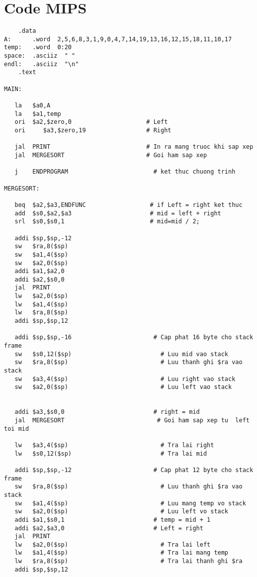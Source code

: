 \documentclass[a4paper]{article}
\begin{document}
\section{Code MIPS}
\begin{verbatim}
    .data 
A:   	.word  2,5,6,8,3,1,9,0,4,7,14,19,13,16,12,15,18,11,10,17
temp: 	.word  0:20
space: 	.asciiz  " "
endl:   .asciiz  "\n"
    .text

MAIN:

   la 	$a0,A
   la 	$a1,temp
   ori 	$a2,$zero,0                     # Left
   ori     $a3,$zero,19                 # Right
	
   jal 	PRINT                           # In ra mang truoc khi sap xep
   jal 	MERGESORT                       # Goi ham sap xep

   j 	ENDPROGRAM                        # ket thuc chuong trinh

MERGESORT:	
			
   beq	$a2,$a3,ENDFUNC                  # if Left = right ket thuc
   add	$s0,$a2,$a3                      # mid = left + right		
   srl	$s0,$s0,1                        # mid=mid / 2;

   addi	$sp,$sp,-12
   sw	$ra,8($sp)
   sw	$a1,4($sp)
   sw	$a2,0($sp)
   addi	$a1,$a2,0
   addi	$a2,$s0,0
   jal 	PRINT
   lw	$a2,0($sp)
   lw	$a1,4($sp)
   lw	$ra,8($sp)
   addi	$sp,$sp,12

   addi	$sp,$sp,-16                       # Cap phat 16 byte cho stack frame
   sw	$s0,12($sp)                         # Luu mid vao stack
   sw	$ra,8($sp)                          # Luu thanh ghi $ra vao stack
   sw	$a3,4($sp)                          # Luu right vao stack
   sw	$a2,0($sp)                          # Luu left vao stack


   addi	$a3,$s0,0                         # right = mid
   jal	MERGESORT                          # Goi ham sap xep tu  left toi mid

   lw	$a3,4($sp)                          # Tra lai right
   lw	$s0,12($sp)                         # Tra lai mid

   addi	$sp,$sp,-12                       # Cap phat 12 byte cho stack frame
   sw	$ra,8($sp)                          # Luu thanh ghi $ra vao stack
   sw	$a1,4($sp)                          # Luu mang temp vo stack
   sw	$a2,0($sp)                          # Luu left vo stack
   addi	$a1,$s0,1                         # temp = mid + 1
   addi	$a2,$a3,0                         # Left = right
   jal 	PRINT
   lw	$a2,0($sp)                          # Tra lai left
   lw	$a1,4($sp)                          # Tra lai mang temp
   lw	$ra,8($sp)                          # Tra lai thanh ghi $ra
   addi	$sp,$sp,12


\end{verbatim}
\end{document}
